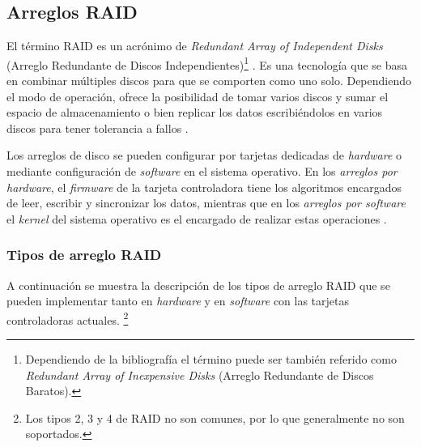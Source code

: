 \newpage
  \subsection {Arreglos RAID}
  \label{Arreglos-RAID}

El t\'{e}rmino \textsc{\gls{RAID}} es un acr\'{o}nimo de \emph{Redundant Array of Independent Disks} (Arreglo Redundante de Discos Independientes)\footnote{Dependiendo de la bibliograf\'{i}a el t\'{e}rmino puede ser tambi\'{e}n referido como \emph{Redundant Array of Inexpensive Disks} (Arreglo Redundante de Discos Baratos).} \cite{_bytepile.com_????}. Es una tecnolog\'{i}a que se basa en combinar m\'{u}ltiples discos para que se comporten como uno solo. Dependiendo el modo de operaci\'{o}n, ofrece la posibilidad de tomar varios discos y sumar el espacio de almacenamiento o bien replicar los datos escribi\'{e}ndolos en varios discos para tener tolerancia a fallos \cite{_raid_????-2}.

Los arreglos de disco se pueden configurar por tarjetas dedicadas de \emph{\gls{hardware}} o mediante configuraci\'{o}n de \emph{\gls{software}} en el sistema operativo. En los \emph{arreglos por \gls{hardware}}, el \emph{\gls{firmware}} de la tarjeta controladora tiene los algoritmos encargados de leer, escribir y sincronizar los datos, mientras que en los \emph{arreglos por \gls{software}} el \textsl{\gls{kernel}} del sistema operativo es el encargado de realizar estas operaciones \cite{_chapter_????}.

\subsubsection*{Tipos de arreglo RAID}

A continuaci\'{o}n se muestra la descripci\'{o}n de los tipos de arreglo \textsc{\gls{RAID}} que se pueden implementar tanto en \emph{\gls{hardware}} y en \emph{\gls{software}} con las tarjetas controladoras actuales. \footnote{Los tipos 2, 3 y 4 de \textsc{\gls{RAID}} no son comunes, por lo que generalmente no son soportados.}

